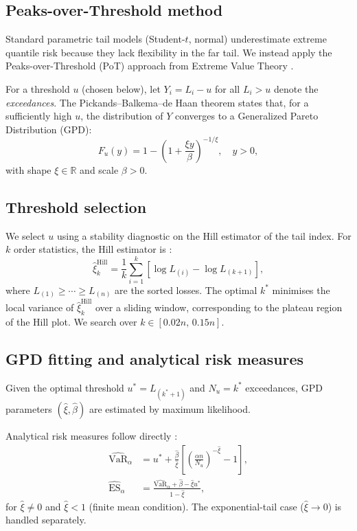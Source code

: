 \documentclass[12pt]{article}
\newcommand{\R}{\mathbb{R}}
\begin{document}
\subsection{Peaks-over-Threshold method}

Standard parametric tail models (Student-$t$, normal) underestimate
extreme quantile risk because they lack flexibility in the far tail.
We instead apply the Peaks-over-Threshold (PoT) approach from
Extreme Value Theory \citep{Pickands1975}.

For a threshold $u$ (chosen below), let
$Y_i = L_i - u$ for all $L_i > u$ denote the \emph{exceedances}.
The Pickands--Balkema--de Haan theorem states that, for a
sufficiently high $u$, the distribution of $Y$ converges to a
Generalized Pareto Distribution (GPD):
\begin{equation}
  F_u(y) = 1 - \left(1 + \frac{\xi y}{\beta}\right)^{-1/\xi},
  \quad y > 0,
\end{equation}
with shape $\xi \in \R$ and scale $\beta > 0$.

\subsection{Threshold selection}

We select $u$ using a stability diagnostic on the Hill estimator of
the tail index.  For $k$ order statistics, the Hill estimator is
\citep{Hill1975}:
\begin{equation}
  \hat\xi_k^{\text{Hill}} = \frac{1}{k}\sum_{i=1}^{k}
    \left[\log L_{(i)} - \log L_{(k+1)}\right],
\end{equation}
where $L_{(1)} \geq \cdots \geq L_{(n)}$ are the sorted losses.
The optimal $k^*$ minimises the local variance of $\hat\xi_k^{\text{Hill}}$
over a sliding window, corresponding to the plateau region of the
Hill plot.  We search over $k \in [0.02n,\, 0.15n]$.

\subsection{GPD fitting and analytical risk measures}

Given the optimal threshold $u^* = L_{(k^*+1)}$ and $N_u = k^*$
exceedances, GPD parameters $(\hat\xi, \hat\beta)$ are estimated by
maximum likelihood.

Analytical risk measures follow directly \citep{McNeilFrey2000}:
\begin{align}
  \widehat{\text{VaR}}_\alpha &= u^* + \frac{\hat\beta}{\hat\xi}
    \left[\left(\frac{\alpha n}{N_u}\right)^{-\hat\xi} - 1\right],
    \label{eq:gpd_var}\\
  \widehat{\text{ES}}_\alpha  &= \frac{\widehat{\text{VaR}}_\alpha + \hat\beta - \hat\xi u^*}
    {1 - \hat\xi},
    \label{eq:gpd_es}
\end{align}
for $\hat\xi \neq 0$ and $\hat\xi < 1$ (finite mean condition).
The exponential-tail case ($\hat\xi \to 0$) is handled separately.
\end{document}
